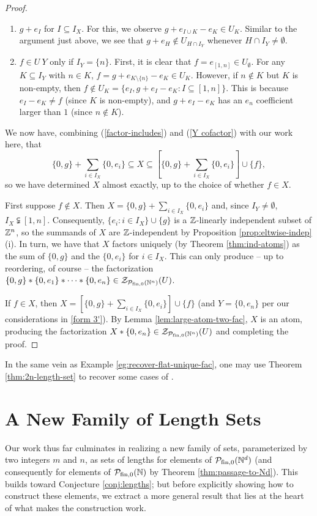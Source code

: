 \begin{proof}
\begin{enumerate}[label={\rm ({\small F\arabic{*}}$'$)}]
		\item $g+e_I$ for $I\subseteq I_X$. \label{form 2'}
		For this, we observe $g+e_{I\cup K} - e_K\in U_K$. 
		Similar to the argument just above, we see that $g+e_H\notin U_{H\cap I_Y}$ whenever $H\cap I_Y\neq\emptyset$.
		\item $f\in U\:Y$ only if $I_Y = \{n\}$. \label{form 3'}
		First, it is clear that $f = e_{[ 1,n ]} \in U_\emptyset$.
		For any $K\subseteq I_Y$ with $n\in K$, $f = g+ e_{K\setminus\{n\}} - e_K\in U_K$.
		However, if $n\notin K$ but $K$ is non-empty, then $f\notin U_K = \{e_I, g+e_I-e_K: I\subseteq [1,n]\}$.
		This is because $e_I - e_K \neq f$ (since $K$ is non-empty), and $g+e_I-e_K$ has an $e_n$ coefficient larger than $1$ (since $n\notin K$).
	\end{enumerate}
	We now have, combining (\ref{factor-includes}) and (\ref{Y cofactor}) with our work here, that
	\[ \{0,g\} + \sum_{i\in I_X}\{0,e_i\} \subseteq X \subseteq \left[\{0,g\}+\sum_{i\in I_X} \{0,e_i\} \right]\cup\{f\},\]
	so we have determined $X$ almost exactly, up to the choice of whether $f\in X$.
	
	First suppose $f\notin X$.
	Then $X = \{0,g\} +\sum_{i\in I_X} \{0,e_i\}$ and, since $I_Y\neq\emptyset$, $I_X\subsetneqq [1,n]$.
	Consequently, $\{e_i: i\in I_X\}\cup\{g\}$ is a $\mathbb{Z}$-linearly independent subset of $\mathbb{Z}^n$, so the summands of $X$ are $\mathbb{Z}$-independent by Proposition \ref{prop:eltwise-indep}(i).
	In turn, we have that $X$ factors uniquely (by Theorem \ref{thm:ind-atoms}) as the sum of $\{0,g\}$ and the $\{0,e_i\}$ for $i\in I_X$.
	This can only produce -- up to reordering, of course -- the factorization $\{0,g\}*\{0,e_1\}*\cdots*\{0,e_n\}\in \mathcal{Z}_{\mathcal{P}_{\textrm{fin}, 0}(\mathbb{N}^n)}(U)$.
	
	If $f\in X$, then $X = \left[\{0,g\}+\sum_{i\in I_X} \{0,e_i\} \right]\cup\{f\}$ (and $Y = \{0,e_n\}$ per our considerations in \ref{form 3'}).
	By Lemma \ref{lem:large-atom-two-fac}, $X$ is an atom, producing the factorization $X*\{0,e_n\}\in \mathcal{Z}_{\mathcal{P}_{\textrm{fin}, 0}(\mathbb{N}^n)}(U)$ and completing the proof.
\end{proof}


\begin{rk}
	In the same vein as Example \ref{eg:recover-flat-unique-fac}, one may use Theorem \ref{thm:2n-length-set} to recover some cases of \cite[Proposition 4.8]{fan-tringali18}.
\end{rk}


\section{A New Family of Length Sets} \label{sec:new length sets}
Our work thus far culminates in realizing a new family of sets, parameterized by two integers $m$ and $n$, as sets of lengths for elements of $\mathcal{P}_{\textrm{fin}, 0}(\mathbb{N}^d)$ (and consequently for elements of ${\mathcal{P}_{\textrm{fin},0}(\mathbb{N})}$ by Theorem \ref{thm:passage-to-Nd}).
This builds toward Conjecture \ref{conj:lengths}; but before explicitly showing how to construct these elements, we extract a more general result that lies at the heart of what makes the construction work. 

